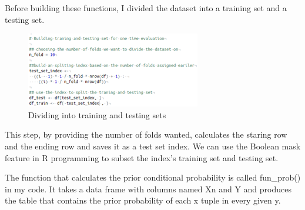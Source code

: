 \documentclass{article}
\begin{document}
\begin{multicols}{2}
        Before building these functions, I divided the dataset into a training set and a testing set. 
        \begin{figure}[H]
            \centering
            \includegraphics[width=\linewidth]{fig3.png}
            \caption{Dividing into training and testing sets}
        \end{figure}
        This step, by providing the number of folds wanted, calculates the staring row and the ending row and saves it as a test set index. We can use the Boolean mask feature in R programming to subset the index's training set and testing set.

        The function that calculates the prior conditional probability is called fun\_prob() in my code. It takes a data frame with columns named Xn and Y and produces the table that contains the prior probability of each x tuple in every given y.


\end{multicols}
\end{document}
